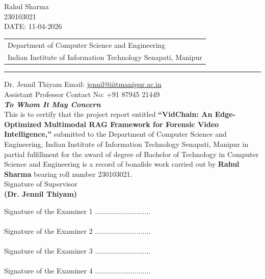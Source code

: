 \documentclass[a4paper, 11pt, oneside]{report}
\begin{document}
\vspace{1cm}\hspace{8.35cm} Rahul Sharma \\
\vspace{1cm}\hspace{9cm} 230103021 \\
\vspace{1cm} DATE: 11-04-2026

\newpage

\begin{center}
	\thispagestyle{empty}
		
		\begin{table}
			\centering
			\begin{tabular}{l}
				Department of Computer Science and Engineering \\
				Indian Institute of Information Technology Senapati, Manipur \\
			\end{tabular}
		\end{table}
		\par\noindent\rule{\textwidth}{0.4pt}
			Dr. Jennil Thiyam
			\hspace*{\fill} Email: \href{mailto:jennil@iiitmanipur.ac.in}{jennil@iiitmanipur.ac.in}\\
			Assistant Professor
			\hspace*{0pt}\hfill Contact No: +91 87945 21449\\[2cm]
			{\Huge \textbf{\emph{To Whom It May Concern}}}\\[2cm]
			\linespread{1.13}
			\large{This is to certify that the project report 
                entitled \textbf{``VidChain: An Edge-Optimized Multimodal RAG Framework for Forensic Video Intelligence,''} submitted to the Department of Computer Science and Engineering, Indian Institute of Information Technology Senapati, Manipur in partial fulfillment for the award of degree of Bachelor of Technology in Computer Science and Engineering is a record of bonafide work carried out by \textbf{Rahul Sharma} bearing roll number 230103021.}\\[2.0cm]
			\hspace*{2.6in}\large{Signature of Supervisor}\\[0.3cm]
			\hspace*{2.5in}\textbf{(Dr. Jennil Thiyam)}\\[0.5cm]
			
	\end{center}
        \vspace{0.5cm}
	Signature of the Examiner 1 ............................\\\\
	Signature of the Examiner 2 ............................\\\\
	Signature of the Examiner 3 ............................\\\\
	Signature of the Examiner 4 ............................\\\\
	\newpage
\end{document}
